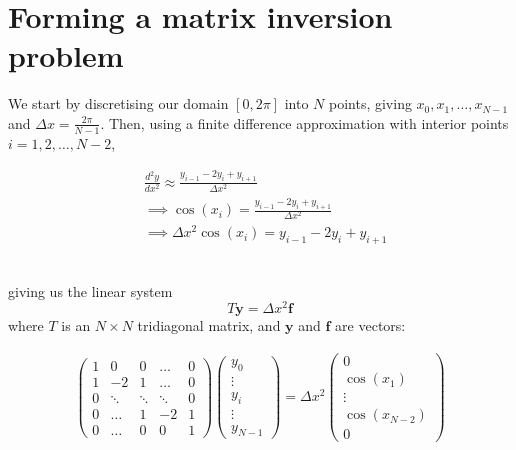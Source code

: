 \documentclass[../main.tex]{subfiles}
\begin{document}
    \section{Forming a matrix inversion problem}\label{sec:bvp-forming-a-matrix-inversion-problem}
    We start by discretising our domain $[0, 2\pi]$ into $N$ points, giving $x_{0}, x_{1}, \dots, x_{N - 1}$ and
    $\Delta x = \frac{2\pi}{N - 1}$.
    Then, using a finite difference approximation with interior points $i = 1, 2, \dots, N - 2$,
    \begin{center*}
        \begin{align*}
            & \frac{d^{2}y}{dx^{2}} \approx \frac{y_{i - 1} - 2y_{i} + y_{i + 1}}{\Delta x^{2}} \\
            & \implies \cos(x_{i}) = \frac{y_{i - 1} - 2y_{i} + y_{i + 1}}{\Delta x^{2}} \\
            & \implies \Delta x^{2} \cos(x_{i}) = y_{i - 1} - 2y_{i} + y_{i + 1}
        \end{align*}
    \end{center*}\\
    giving us the linear system
    \[
        T \textbf{y} = \Delta x^{2} \textbf{f}
    \]
    where $T$ is an $N \times N$ tridiagonal matrix, and $\textbf{y}$ and $\textbf{f}$ are vectors:
    \begin{center*}
        \begin{align*}
            \begin{pmatrix}
                1 & 0 & 0 & \dots & 0 \\
                1 & -2 & 1 & \dots & 0 \\
                0 & \ddots & \ddots & \ddots & 0 \\
                0 & \dots & 1 & -2 & 1 \\
                0 & \dots & 0 & 0 & 1
            \end{pmatrix}
            \begin{pmatrix}
                y_{0} \\
                \vdots \\
                y_{i} \\
                \vdots \\
                y_{N - 1}
            \end{pmatrix} =
            \Delta x^{2} \begin{pmatrix}
                0 \\
                \cos(x_{1}) \\
                \vdots \\
                \cos(x_{N - 2}) \\
                0
            \end{pmatrix}
        \end{align*}
    \end{center*}\\
\end{document}
